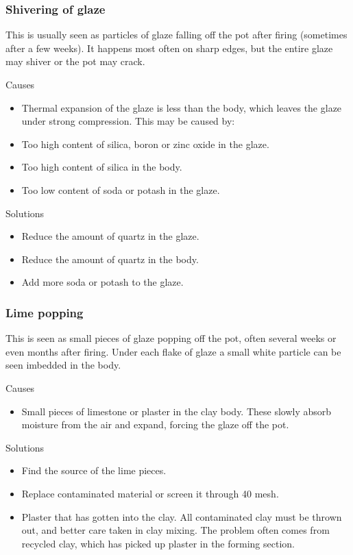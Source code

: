 \subsubsection{Shivering of glaze}
This is usually seen as particles of glaze falling off the pot after firing 
(sometimes after a few weeks). It happens most often on sharp edges, but the 
entire glaze may shiver or the pot may crack.

Causes
\begin{itemize}
\item Thermal expansion of the glaze is less than the body, which leaves the 
glaze 
under strong compression. This may be caused by:
\item Too high content of silica, boron or zinc oxide in the glaze.
\item Too high content of silica in the body.
\item Too low content of soda or potash in the glaze.
\end{itemize}
Solutions
\begin{itemize}
\item Reduce the amount of quartz in the glaze.
\item Reduce the amount of quartz in the body.
\item Add more soda or potash to the glaze.
\end{itemize}
\subsubsection{Lime popping}
This is seen as small pieces of glaze popping off the pot, often several weeks 
or even months after firing. Under each flake of glaze a small white particle 
can be seen imbedded in the body.

Causes
\begin{itemize}
\item Small pieces of limestone or plaster in the clay body. These slowly 
absorb moisture from the air and expand, forcing the glaze off the pot.
\end{itemize}
Solutions
\begin{itemize}
\item Find the source of the lime pieces.
\item Replace contaminated material or screen it through 40 mesh.
\item Plaster that has gotten into the clay. All contaminated clay must be 
thrown out, and better care taken in clay mixing. The problem often comes from 
recycled clay, which has picked up plaster in the forming section.
\end{itemize}
